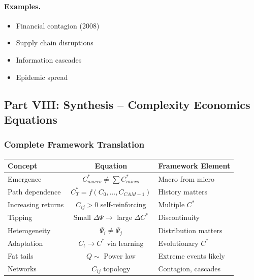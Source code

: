 \paragraph{Examples.}
\begin{itemize}
    \item Financial contagion (2008)
    \item Supply chain disruptions
    \item Information cascades
    \item Epidemic spread
\end{itemize}

\subsection{Part VIII: Synthesis – Complexity Economics Equations}

\subsubsection{Complete Framework Translation}

\begin{center}
\renewcommand{\arraystretch}{1.5}
\begin{tabular}{|l|c|l|}
\hline
\textbf{Concept} & \textbf{Equation} & \textbf{Framework Element} \\
\hline
Emergence & $C^*_{macro} \neq \sum C^*_{micro}$ & Macro from micro \\
\hline
Path dependence & $C^*_T = f(C_0, \ldots, C_{CAM-1})$ & History matters \\
\hline
Increasing returns & $C_{ij} > 0$ self-reinforcing & Multiple $C^*$ \\
\hline
Tipping & Small $\Delta\Psi \to$ large $\Delta C^*$ & Discontinuity \\
\hline
Heterogeneity & $\Psi_i \neq \Psi_j$ & Distribution matters \\
\hline
Adaptation & $C_t \to C^*$ via learning & Evolutionary $C^*$ \\
\hline
Fat tails & $Q \sim$ Power law & Extreme events likely \\
\hline
Networks & $C_{ij}$ topology & Contagion, cascades \\
\hline
\end{tabular}
\end{center}

